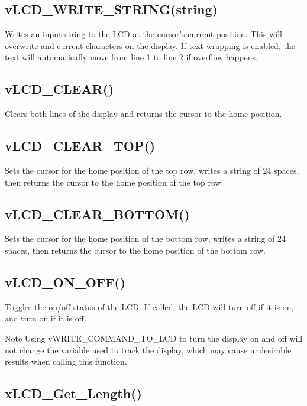 \hypertarget{_usage_write_string}{}\subsection{v\-L\-C\-D\-\_\-\-W\-R\-I\-T\-E\-\_\-\-S\-T\-R\-I\-N\-G(string)}\label{_usage_write_string}
Writes an input string to the L\-C\-D at the cursor's current position. This will overwrite and current characters on the display. If text wrapping is enabled, the text will automatically move from line 1 to line 2 if overflow happens.\hypertarget{_test_plans_clear}{}\subsection{v\-L\-C\-D\-\_\-\-C\-L\-E\-A\-R()}\label{_test_plans_clear}
Clears both lines of the display and returns the cursor to the home position.\hypertarget{_test_plans_clear_top}{}\subsection{v\-L\-C\-D\-\_\-\-C\-L\-E\-A\-R\-\_\-\-T\-O\-P()}\label{_test_plans_clear_top}
Sets the cursor for the home position of the top row, writes a string of 24 spaces, then returns the cursor to the home position of the top row.\hypertarget{_test_plans_clear_bottom}{}\subsection{v\-L\-C\-D\-\_\-\-C\-L\-E\-A\-R\-\_\-\-B\-O\-T\-T\-O\-M()}\label{_test_plans_clear_bottom}
Sets the cursor for the home position of the bottom row, writes a string of 24 spaces, then returns the cursor to the home position of the bottom row.\hypertarget{_test_plans_onoff}{}\subsection{v\-L\-C\-D\-\_\-\-O\-N\-\_\-\-O\-F\-F()}\label{_test_plans_onoff}
Toggles the on/off status of the L\-C\-D. If called, the L\-C\-D will turn off if it is on, and turn on if it is off. \begin{DoxyNote}{Note}
Using v\-W\-R\-I\-T\-E\-\_\-\-C\-O\-M\-M\-A\-N\-D\-\_\-\-T\-O\-\_\-\-L\-C\-D to turn the display on and off will not change the variable used to track the display, which may cause undesirable results when calling this function.
\end{DoxyNote}
\hypertarget{_usage_length}{}\subsection{x\-L\-C\-D\-\_\-\-Get\-\_\-\-Length()}\label{_usage_length}
